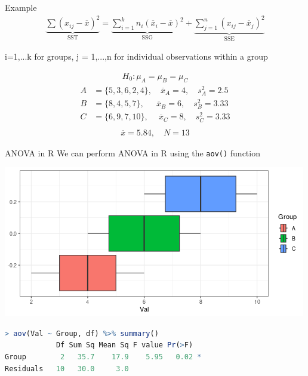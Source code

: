 \documentclass{beamer}
\begin{document}
\begin{frame}{Example}
\scriptsize
\begin{align*}
\underbrace{\sum (x_{ij} - \overline{x})^2}_{\text{SST}} = \underbrace{\sum_{i=1}^k n_i(\overline{x}_i - \overline{x})^2}_{\text{SSG}} +\underbrace{\sum_{j=1}^n (x_{ij} - \overline{x}_j)^2}_{\text{SSE}}
\end{align*}
\begin{center}
i=1,...k for groups, j = 1,...,n for individual observations within a group
\end{center}
\normalsize
\begin{align*}
H_0: \mu_A = \mu_B = \mu_C
\end{align*}
\vspace{-8mm}
\begin{align*}
A &= \{5,3,6,2,4\}, \quad \overline{x}_A = 4, \quad s_A^2 = 2.5 \\
B &= \{8, 4, 5, 7\}, \ \  \quad \overline{x}_B = 6, \quad s_B^2 = 3.33 \\
C &= \{6, 9, 7, 10\}, \ \quad \overline{x}_C = 8, \quad s_C^2 = 3.33 \\
\end{align*}
\vspace{-15mm}
\begin{align*}
\overline{x} = 5.84, \quad N = 13
\end{align*}

\end{frame}

\begin{frame}[fragile]{ANOVA in R}
We can perform ANOVA in R using the \texttt{aov()} function

\begin{center}
\includegraphics[scale=0.5]{example_group.png}
\end{center}

\begin{lstlisting}[language=R]
> aov(Val ~ Group, df) %>% summary()
            Df Sum Sq Mean Sq F value Pr(>F)  
Group        2   35.7    17.9    5.95   0.02 *
Residuals   10   30.0     3.0   
\end{lstlisting}

\end{frame}
\end{document}
